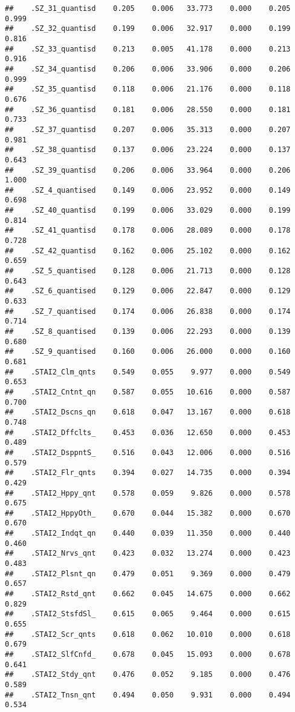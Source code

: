\documentclass[]{article}
\begin{document}
\begin{verbatim}
##    .SZ_31_quantisd    0.205    0.006   33.773    0.000    0.205    0.999
##    .SZ_32_quantisd    0.199    0.006   32.917    0.000    0.199    0.816
##    .SZ_33_quantisd    0.213    0.005   41.178    0.000    0.213    0.916
##    .SZ_34_quantisd    0.206    0.006   33.906    0.000    0.206    0.999
##    .SZ_35_quantisd    0.118    0.006   21.176    0.000    0.118    0.676
##    .SZ_36_quantisd    0.181    0.006   28.550    0.000    0.181    0.733
##    .SZ_37_quantisd    0.207    0.006   35.313    0.000    0.207    0.981
##    .SZ_38_quantisd    0.137    0.006   23.224    0.000    0.137    0.643
##    .SZ_39_quantisd    0.206    0.006   33.964    0.000    0.206    1.000
##    .SZ_4_quantised    0.149    0.006   23.952    0.000    0.149    0.698
##    .SZ_40_quantisd    0.199    0.006   33.029    0.000    0.199    0.814
##    .SZ_41_quantisd    0.178    0.006   28.089    0.000    0.178    0.728
##    .SZ_42_quantisd    0.162    0.006   25.102    0.000    0.162    0.659
##    .SZ_5_quantised    0.128    0.006   21.713    0.000    0.128    0.643
##    .SZ_6_quantised    0.129    0.006   22.847    0.000    0.129    0.633
##    .SZ_7_quantised    0.174    0.006   26.838    0.000    0.174    0.714
##    .SZ_8_quantised    0.139    0.006   22.293    0.000    0.139    0.680
##    .SZ_9_quantised    0.160    0.006   26.000    0.000    0.160    0.681
##    .STAI2_Clm_qnts    0.549    0.055    9.977    0.000    0.549    0.653
##    .STAI2_Cntnt_qn    0.587    0.055   10.616    0.000    0.587    0.700
##    .STAI2_Dscns_qn    0.618    0.047   13.167    0.000    0.618    0.748
##    .STAI2_Dffclts_    0.453    0.036   12.650    0.000    0.453    0.489
##    .STAI2_DsppntS_    0.516    0.043   12.006    0.000    0.516    0.579
##    .STAI2_Flr_qnts    0.394    0.027   14.735    0.000    0.394    0.429
##    .STAI2_Hppy_qnt    0.578    0.059    9.826    0.000    0.578    0.675
##    .STAI2_HppyOth_    0.670    0.044   15.382    0.000    0.670    0.670
##    .STAI2_Indqt_qn    0.440    0.039   11.350    0.000    0.440    0.460
##    .STAI2_Nrvs_qnt    0.423    0.032   13.274    0.000    0.423    0.483
##    .STAI2_Plsnt_qn    0.479    0.051    9.369    0.000    0.479    0.657
##    .STAI2_Rstd_qnt    0.662    0.045   14.675    0.000    0.662    0.829
##    .STAI2_StsfdSl_    0.615    0.065    9.464    0.000    0.615    0.655
##    .STAI2_Scr_qnts    0.618    0.062   10.010    0.000    0.618    0.679
##    .STAI2_SlfCnfd_    0.678    0.045   15.093    0.000    0.678    0.641
##    .STAI2_Stdy_qnt    0.476    0.052    9.185    0.000    0.476    0.589
##    .STAI2_Tnsn_qnt    0.494    0.050    9.931    0.000    0.494    0.534

\end{verbatim}
\end{document}
